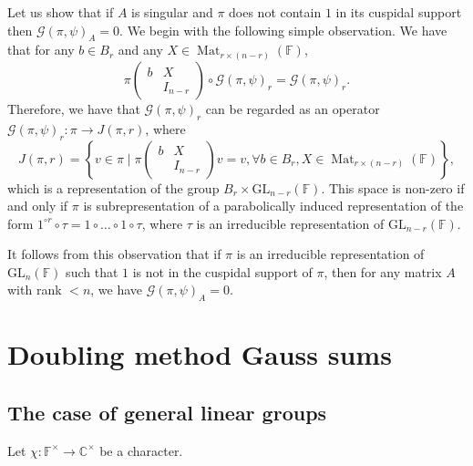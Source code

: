 \documentclass[12pt, reqno]{amsart}
\theoremstyle{definition}
\theoremstyle{definition}
\theoremstyle{definition}
\newcommand{\cComplex}{\mathbb{C}}
\newcommand{\multiplicativegroup}[1]{#1^{\times}}
\newcommand{\fieldCharacter}{\psi}
\newcommand{\IdentityMatrix}[1]{I_{#1}}
\newcommand{\GL}{\mathrm{GL}}
\newcommand{\finiteField}{\mathbb{F}}
\newcommand{\Mat}[2]{\operatorname{Mat}_{#1 \times #2}}
\newcommand{\GaussSum}[2]{\mathcal{G}\left(#1, #2\right)}
\begin{document}
Let us show that if $A$ is singular and $\pi$ does not contain $1$ in its cuspidal support then $\GaussSum{\pi}{\fieldCharacter}_A = 0$. We begin with the following simple observation. We have that for any $b \in B_r$ and any $X \in \Mat{r}{(n-r)}\left(\finiteField\right)$,
$$ \pi\begin{pmatrix}
b & X\\
& \IdentityMatrix{n-r}
\end{pmatrix} \circ \GaussSum{\pi}{\fieldCharacter}_r = \GaussSum{\pi}{\fieldCharacter}_r.$$
Therefore, we have that $\GaussSum{\pi}{\fieldCharacter}_r$ can be regarded as an operator $\GaussSum{\pi}{\fieldCharacter}_r \colon \pi \to J\left(\pi, r\right)$, where $$J\left(\pi, r\right) = \left\{ v \in \pi \mid \pi \begin{pmatrix}
	b & X\\
	& \IdentityMatrix{n-r}
\end{pmatrix} v = v, \forall b \in B_r, X \in \Mat{r}{(n-r)}\left(\finiteField\right) \right\},$$
which is a representation of the group $B_r \times \GL_{n-r}\left(\finiteField\right)$. This space is non-zero if and only if $\pi$ is subrepresentation of a parabolically induced representation of the form $1^{\circ r} \circ \tau = 1 \circ \dots \circ 1 \circ \tau$, where $\tau$ is an irreducible representation of $\GL_{n-r}\left(\finiteField\right)$. 

It follows from this observation that if $\pi$ is an irreducible representation of $\GL_n\left(\finiteField\right)$ such that $1$ is not in the cuspidal support of $\pi$, then for any matrix $A$ with rank $< n$, we have $\GaussSum{\pi}{\fieldCharacter}_A = 0$.

\section{Doubling method Gauss sums}

\subsection{The case of general linear groups}

Let $\chi \colon \multiplicativegroup{\finiteField} \to \multiplicativegroup{\cComplex}$ be a character.
\end{document}
